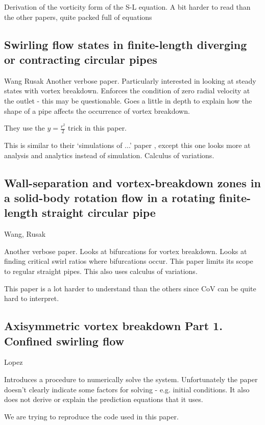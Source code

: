 \documentclass{X:/Documents/Coding/Latex/myreport}
\begin{document}
Derivation of the vorticity form of the S-L equation.
A bit harder to read than the other papers, quite packed full of equations



\subsection{Swirling flow states in finite-length diverging or contracting circular pipes}
Wang Rusak
Another verbose paper. Particularly interested in looking at steady states with vortex breakdown. 
Enforces the condition of zero radial velocity at the outlet - this may be questionable.
Goes a little in depth to explain how the shape of a pipe affects the occurrence of vortex breakdown.

They use the $y = \frac{r^2}{2}$ trick in this paper.

This is similar to their `simulations of ...' paper , except this one looks more at analysis and analytics instead of simulation.
Calculus of variations.

\subsection{Wall-separation and vortex-breakdown zones in a solid-body rotation flow in a rotating finite-length straight circular pipe}
Wang, Rusak

Another verbose paper. Looks at bifurcations for vortex breakdown. Looks at finding critical swirl ratios where bifurcations occur. This paper limits its scope to regular straight pipes. This also uses calculus of variations.

This paper is a lot harder to understand than the others since CoV can be quite hard to interpret.



\subsection{Axisymmetric vortex breakdown Part 1. Confined swirling flow}

Lopez

Introduces a procedure to numerically solve the system. Unfortunately the paper doesn't clearly indicate some factors for solving - e.g. initial conditions. It also does not derive or explain the prediction equations that it uses.


We are trying to reproduce the code used in this paper.
\end{document}
